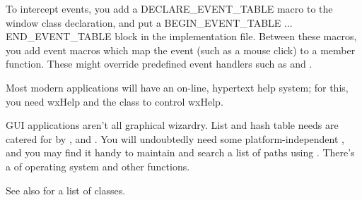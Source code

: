 To intercept events, you add a DECLARE\_EVENT\_TABLE macro to the window class declaration,
and put a BEGIN\_EVENT\_TABLE ... END\_EVENT\_TABLE block in the implementation file. Between these
macros, you add event macros which map the event (such as a mouse click) to a member function.
These might override predefined event handlers such as  and
\rtfsp{}.

Most modern applications will have an on-line, hypertext help system; for this, you
need wxHelp and the  class to control
wxHelp.

GUI applications aren't all graphical wizardry. List and hash table needs are
catered for by ,  and .
You will undoubtedly need some platform-independent ,
and you may find it handy to maintain and search a list of paths using .
There's a  of operating system and other functions.

See also  for a list of classes.

